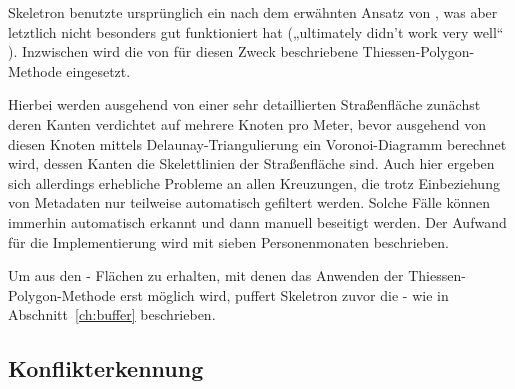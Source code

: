 \documentclass[../main/thesis.tex]{subfiles}
\begin{document}

Skeletron benutzte ursprünglich ein  nach dem erwähnten Ansatz von \citeauthor{HS04}, was aber letztlich nicht besonders gut funktioniert hat („ultimately didn't work very well“ ).
Inzwischen wird die von \citeauthor{LM96} für diesen Zweck beschriebene Thiessen-Polygon-Methode eingesetzt.


Hierbei werden ausgehend von einer sehr detaillierten Straßenfläche zunächst deren Kanten verdichtet auf mehrere Knoten pro Meter, bevor ausgehend von diesen Knoten mittels Delaunay-Triangulierung ein Voronoi-Diagramm berechnet wird, dessen Kanten die Skelettlinien der Straßenfläche sind.
Auch hier ergeben sich allerdings erhebliche Probleme an allen Kreuzungen, die trotz Einbeziehung von Metadaten nur teilweise automatisch gefiltert werden.
Solche Fälle können immerhin automatisch erkannt und dann manuell beseitigt werden.
Der Aufwand für die Implementierung wird mit sieben Personenmonaten beschrieben. 

Um aus den \osm- Flächen zu erhalten, mit denen das Anwenden der Thiessen-Polygon-Methode erst möglich wird, puffert Skeletron zuvor die \osm- wie in Abschnitt~\ref{ch:buffer} beschrieben. 


\subsection{Konflikterkennung}
\label{ch:conflict-detection}

\end{document}
